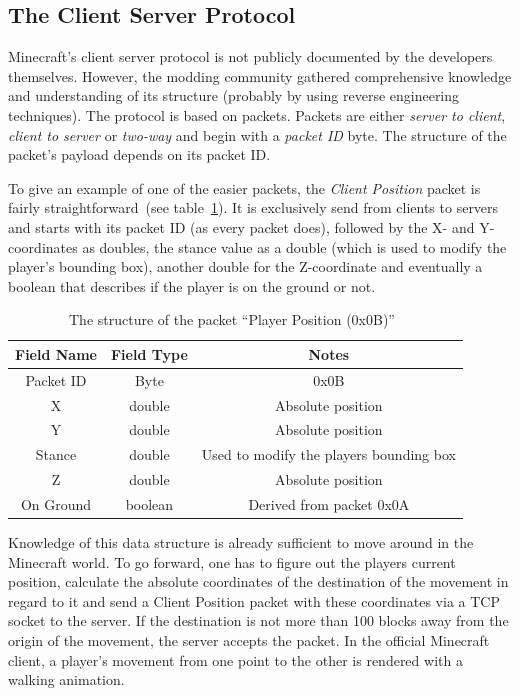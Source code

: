         \subsection{The Client Server Protocol}
        \label{client_server_protocol}
Minecraft's client server protocol is not publicly documented by the developers themselves. However, the modding community gathered comprehensive knowledge and understanding of its structure (probably by using reverse engineering techniques). The protocol is based on packets. 
Packets are either \emph{server to client}, \emph{client to server} or \emph{two-way} and begin with a \emph{packet ID} byte. The structure of the packet's payload depends on its packet ID.
 
To give an example of one of the easier packets, the \emph{Client Position} packet is fairly straightforward~(see table~\ref{mc_packet}). It is exclusively send from clients to servers and starts with its packet ID (as every packet does), followed by the X- and Y-coordinates as doubles, the stance value as a double (which is used to modify the player's bounding box), another double for the Z-coordinate and eventually a boolean that describes if the player is on the ground or not.~\cite{protocol}

\begin{table}[htb]
\centering
\begin{tabular}{|c|c|c|}\hline

    Field Name & Field Type & Notes \\ \hline
   Packet ID & Byte & 0x0B \\ \hline
   X & double & Absolute position \\ \hline
   Y & double & Absolute position \\ \hline
   Stance & double & Used to modify the players bounding box \\ \hline
   Z & double & Absolute position \\ \hline
   On Ground & boolean & Derived from packet 0x0A \\ \hline
   
\end{tabular}
\caption{The structure of the packet ``Player Position (0x0B)''~\cite{protocol}}
\label{mc_packet}
\end{table}

Knowledge of this data structure is already sufficient to move around in the Minecraft world. To go forward, one has to figure out the players current position, calculate the absolute coordinates of the destination of the movement in regard to it and send a Client Position packet with these coordinates via a TCP socket to the server. If the destination is not more than 100 blocks away from the origin of the movement, the server accepts the packet. In the official Minecraft client, a player's movement from one point to the other is rendered with a walking animation.

